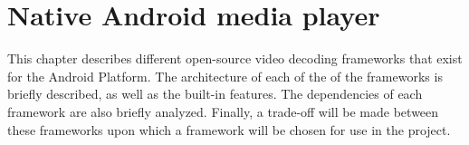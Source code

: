 \section{Native Android media player}
This chapter describes different open-source video decoding frameworks that exist for the Android Platform. The architecture of each of the  of the frameworks is briefly described, as well as the built-in features. The dependencies of each framework are also briefly analyzed. Finally, a trade-off will be made between these frameworks upon which a framework will be chosen for use in the project.